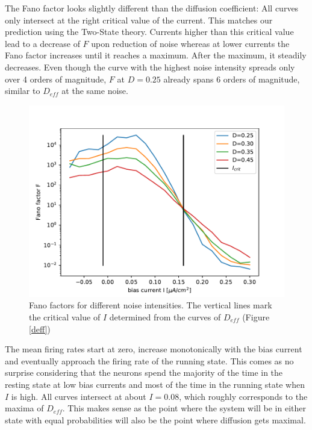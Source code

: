 \documentclass[12pt,a4paper]{article}
\begin{document}
The Fano factor looks slightly different than the diffusion coefficient: All curves only intersect at the right critical value of the current. This matches our prediction using the Two-State theory. Currents higher than this critical value lead to a decrease of $F$ upon reduction of noise whereas at lower currents the Fano factor increases until it reaches a maximum. After the maximum, it steadily decreases. Even though the curve with the highest noise intensity spreads only over 4 orders of magnitude, $F$ at $D=0.25$ already spans  6 orders of magnitude, similar to $D_{eff}$ at the same noise. 
\begin{figure}[H]
	\centering
	\includegraphics[scale=1]{fneur25critsprealfast16alcoarsewstfrealfast9acoarsetf.pdf}\caption{Fano factors for different noise intensities. The vertical lines mark the critical value of $I$ determined from the curves of $D_{eff}$ (Figure \ref{deff})}
	\label{fano}
\end{figure}
The mean firing rates start at zero, increase monotonically with the bias current and eventually approach the firing rate of the running state. This comes as no surprise considering that the neurons spend the majority of the time in the resting state at low bias currents and most of the time in the running state when $I$ is high. All curves intersect at about $I=0.08$, which roughly corresponds to the maxima of $D_{eff}$. This makes sense as the point where the system will be in either state with equal probabilities will also be the point where diffusion gets maximal.
\end{document}
